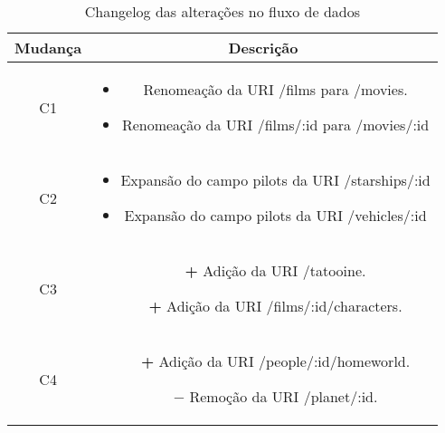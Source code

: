 \begin{table}[H]
  \centering
  \begin{tabular}{|c|c|}
    \hline
    Mudança & Descrição \\
    \hline
    C1 & \begin{minipage}[t]{0.8\textwidth}
      \begin{itemize}
        \item Renomeação da URI /films para /movies.
        \item Renomeação da URI /films/:id para /movies/:id
      \end{itemize}
    \end{minipage} \\
    \hline
    C2 & \begin{minipage}[t]{0.8\textwidth}
      \begin{itemize}
        \item Expansão do campo pilots da URI /starships/:id
        \item Expansão do campo pilots da URI /vehicles/:id
      \end{itemize}
    \end{minipage} \\
    \hline
    C3 & \begin{minipage}[t]{0.8\textwidth}
      \begin{itemize}
        \item[\textbf{+}] Adição da URI /tatooine.
        \item[\textbf{+}] Adição da URI /films/:id/characters.
      \end{itemize}
    \end{minipage} \\
    \hline
    C4 & \begin{minipage}[t]{0.8\textwidth}
      \begin{itemize}
        \item[\textbf{+}] Adição da URI /people/:id/homeworld.
        \item[\textbf{$-$}] Remoção da URI /planet/:id.
      \end{itemize}
    \end{minipage} \\
    \hline
  \end{tabular}
  \caption{Changelog das alterações no fluxo de dados}
\end{table}

